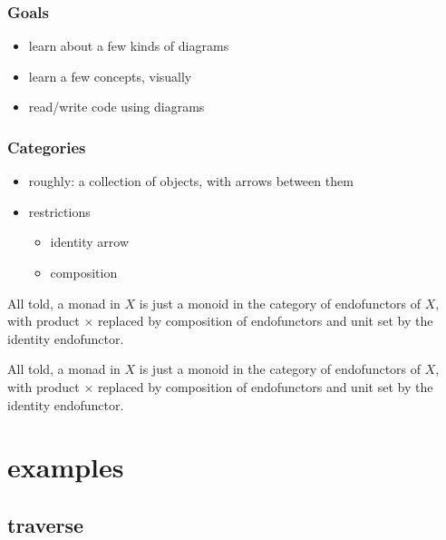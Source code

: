 \documentclass[include/preamble.tex]{subfiles}
\begin{document}
\begin{frame}
  \frametitle{Goals}
  \begin{itemize}
  \item learn about a few kinds of diagrams
  \item learn a few concepts, visually
  \item read/write code using diagrams
  \end{itemize}
\end{frame}

\begin{frame}
  \frametitle{Categories}
  \begin{itemize}
  \item roughly: a collection of objects, with arrows between them
  \item restrictions
    \begin{itemize}
    \item identity arrow
    \item composition
    \end{itemize}
  \end{itemize}
\end{frame}



\begin{frame}
  \begin{displayquote}
    All told, a monad in \(X\) is just a monoid in the category of
    endofunctors of \(X\), with product \(\times\) replaced by composition of
    endofunctors and unit set by the identity endofunctor.
  \end{displayquote}
\end{frame}

\begin{frame}
  \begin{displayquote}
    All told, a monad in \(X\) is just a monoid in the category of
    endofunctors of \(X\), with product \(\times\) replaced by composition of
    endofunctors and unit set by the identity endofunctor.
  \end{displayquote}
\end{frame}

\section{examples}
\subsection{traverse}
\end{document}
